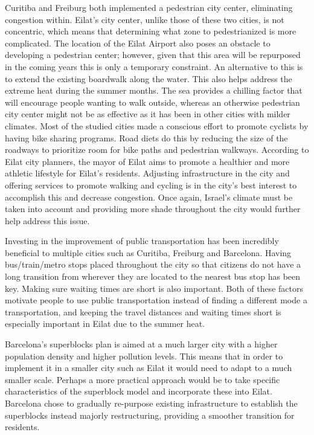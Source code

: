 \documentclass[12pt]{article}                       %
\begin{document}
Curitiba and Freiburg both implemented a pedestrian city center, eliminating congestion within. Eilat's city center, unlike those of these two cities, is not concentric, which means that determining what zone to pedestrianized is more complicated. The location of the Eilat Airport also poses an obstacle to developing a pedestrian center; however, given that this area will be repurposed in the coming years this is only a temporary constraint. An alternative to this is to extend the existing boardwalk along the water. This also helps address the extreme heat during the summer months. The sea provides a chilling factor that will encourage people wanting to walk outside, whereas an otherwise pedestrian city center might not be as effective as it has been in other cities with milder climates. Most of the studied cities made a conscious effort to promote cyclists by having bike sharing programs. Road diets do this by reducing the size of the roadways to prioritize room for bike paths and pedestrian walkways. According to Eilat city planners, the mayor of Eilat aims to promote a healthier and more athletic lifestyle for Eilat's residents. Adjusting infrastructure in the city and offering services to promote walking and cycling is in the city's best interest to accomplish this and decrease congestion. Once again, Israel's climate must be taken into account and providing more shade throughout the city would further help address this issue. 

Investing in the improvement of public transportation has been incredibly beneficial to multiple cities such as Curitiba, Freiburg and Barcelona. Having bus/train/metro stops placed throughout the city so that citizens do not have a long transition from wherever they are located to the nearest bus stop has been key. Making sure waiting times are short is also important. Both of these factors motivate people to use public transportation instead of finding a different mode a transportation, and keeping the travel distances and waiting times short is especially important in Eilat due to the summer heat. 

Barcelona's superblocks plan is aimed at a much larger city with a higher population density and higher pollution levels. This means that in order to implement it in a smaller city such as Eilat it would need to adapt to a much smaller scale. Perhaps a more practical approach would be to take specific characteristics of the superblock model and incorporate these into Eilat. Barcelona chose to gradually re-purpose existing infrastructure to establish the superblocks instead majorly restructuring, providing a smoother transition for residents.
\end{document}
